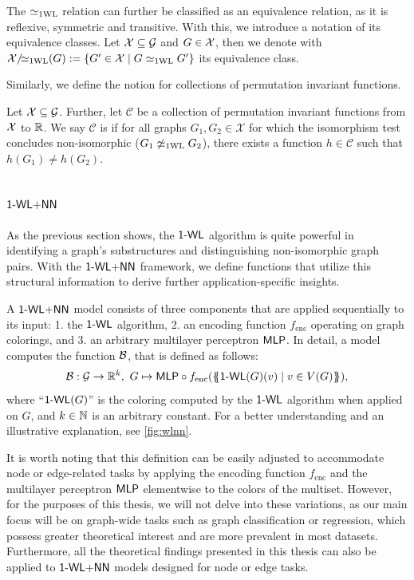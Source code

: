 The $\simeq_{\text{1WL}}$ relation can further be classified as an equivalence relation, as it is reflexive, symmetric and transitive. With this, we introduce a notation of its equivalence classes. Let $\mathcal{X} \subseteq \mathcal{G}$ and $G \in \mathcal{X}$, then we denote with $\mathcal{X}/\!{\simeq_{\text{1WL}}}(G): = \{ G' \in \mathcal{X} \mid G \simeq_{\text{1WL}} G' \}$ its equivalence class.

Similarly, we define the notion \wldisc for collections of permutation invariant functions. 

\begin{definition}[\wldisc]
    Let $\mathcal{X} \subseteq \mathcal{G}$. Further, let $\mathcal{C}$ be a collection of permutation invariant functions from $\mathcal{X}$ to $\mathbb{R}$. We say $\mathcal{C}$ is \textbf{\wldisc} if for all graphs $G_1, G_2 \in \mathcal{X}$ for which the \wl isomorphism test concludes non-isomorphic ($G_1 \not\simeq_{\text{1WL}} G_2$), there exists a function $h \in \mathcal{C}$ such that $h(G_1) \neq h(G_2)$.
\end{definition}

\subsection{$\wlnn$}\label{sec:definition_wlnn}
As the previous section shows, the $\textsf{1-WL}$ algorithm is quite powerful in identifying a graph's substructures and distinguishing non-isomorphic graph pairs. With the $\wlnn$ framework, we define functions that utilize this structural information to derive further application-specific insights.

\begin{definition}[$\wlnn$]
    A $\wlnn$ model consists of three components that are applied sequentially to its input: 1. the $\textsf{1-WL}$ algorithm, 2. an encoding function $f_\text{enc}$ operating on graph colorings, and 3. an arbitrary multilayer perceptron $\textsf{MLP}$. In detail, a \wlnn model computes the function $\mathcal{B}$, that is defined as follows:
    \begin{align*}
        \mathcal{B}: \mathcal{G} \rightarrow \mathbb{R}^k, \ G \mapsto \textsf{MLP} \circ f_{\text{enc}}(\{\!\!\{ \textsf{1-WL}(G)(v) \mid v \in V(G) \}\!\!\}),
    \end{align*}
    where ``$\textsf{1-WL}(G)$'' is the coloring computed by the $\textsf{1-WL}$ algorithm when applied on $G$, and $k \in \mathbb{N}$ is an arbitrary constant. For a better understanding and an illustrative explanation, see \cref{fig:wlnn}.
\end{definition}

It is worth noting that this definition can be easily adjusted to accommodate node or edge-related tasks by applying the encoding function $f_\text{enc}$ and the multilayer perceptron $\textsf{MLP}$ elementwise to the colors of the multiset. However, for the purposes of this thesis, we will not delve into these variations, as our main focus will be on graph-wide tasks such as graph classification or regression, which possess greater theoretical interest and are more prevalent in most datasets. Furthermore, all the theoretical findings presented in this thesis can also be applied to $\wlnn$ models designed for node or edge tasks.

